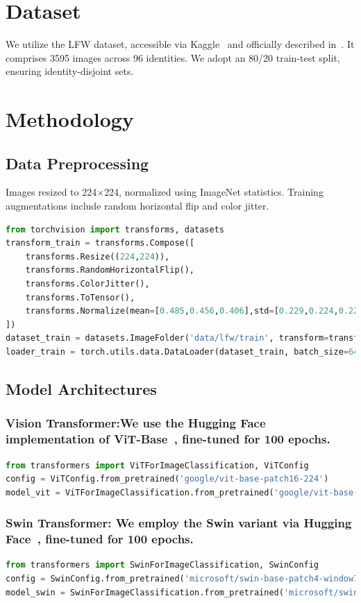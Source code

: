 \documentclass[twocolumn]{IEEEtran}
\begin{document}
\section{Dataset}
We utilize the LFW dataset, accessible via Kaggle~\cite{kaggle_lfw} and officially described in~\cite{huang2008lfw}. It comprises 3595 images across 96 identities. We adopt an 80/20 train-test split, ensuring identity-disjoint sets.

\section{Methodology}
\subsection{Data Preprocessing}
Images resized to 224\(\times\)224, normalized using ImageNet statistics. Training augmentations include random horizontal flip and color jitter.
\begin{lstlisting}[language=Python, caption=DataLoader and Transforms]
from torchvision import transforms, datasets
transform_train = transforms.Compose([
    transforms.Resize((224,224)),
    transforms.RandomHorizontalFlip(),
    transforms.ColorJitter(),
    transforms.ToTensor(),
    transforms.Normalize(mean=[0.485,0.456,0.406],std=[0.229,0.224,0.225])
])
dataset_train = datasets.ImageFolder('data/lfw/train', transform=transform_train)
loader_train = torch.utils.data.DataLoader(dataset_train, batch_size=64, shuffle=True)
\end{lstlisting}

\subsection{Model Architectures}
\setlength{\parindent}{0pt}
\subsubsection{Vision Transformer:We use the Hugging Face implementation of ViT-Base~\cite{huggingface_vit}, fine-tuned for 100 epochs.}
\begin{lstlisting}[language=Python, caption=ViT Model Initialization]
from transformers import ViTForImageClassification, ViTConfig
config = ViTConfig.from_pretrained('google/vit-base-patch16-224')
model_vit = ViTForImageClassification.from_pretrained('google/vit-base-patch16-224', config=config)
\end{lstlisting}

\subsubsection{Swin Transformer: We employ the Swin variant via Hugging Face~\cite{huggingface_swin}, fine-tuned for 100 epochs.}
\begin{lstlisting}[language=Python, caption=Swin Transformer Initialization]
from transformers import SwinForImageClassification, SwinConfig
config = SwinConfig.from_pretrained('microsoft/swin-base-patch4-window7-224')
model_swin = SwinForImageClassification.from_pretrained('microsoft/swin-base-patch4-window7-224', config=config)
\end{lstlisting}
\end{document}
